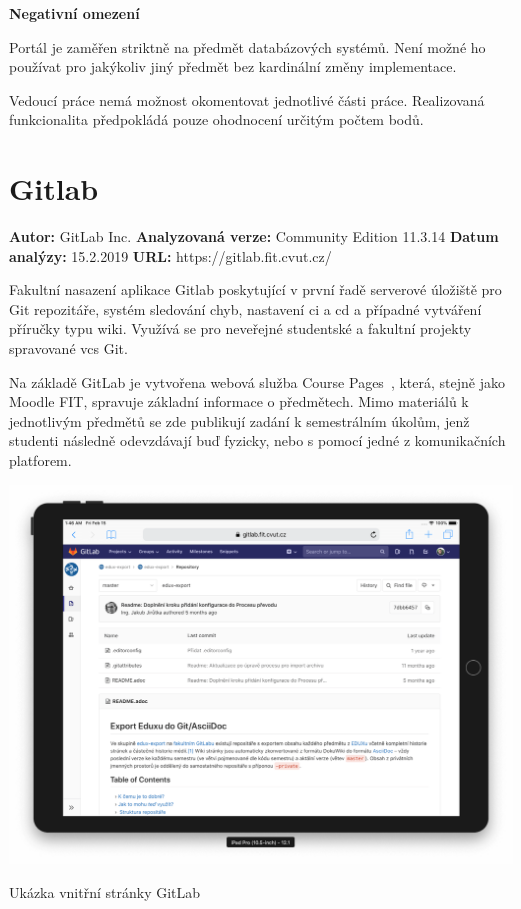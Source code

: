 \textbf{Negativní omezení}

\begin{ul}
   \item
   Portál je zaměřen striktně na předmět databázových systémů. Není možné ho používat pro jakýkoliv jiný předmět bez kardinální změny implementace.
   \item
   Vedoucí práce nemá možnost okomentovat jednotlivé části práce. Realizovaná funkcionalita předpokládá pouze ohodnocení určitým počtem bodů.
\end{ul}




\section{Gitlab}

\textbf{Autor:} GitLab Inc.\newline
\textbf{Analyzovaná verze:} Community Edition 11.3.14\newline
\textbf{Datum analýzy:} 15.2.2019\newline
\textbf{URL:} https://gitlab.fit.cvut.cz/

Fakultní nasazení aplikace Gitlab poskytující v první řadě serverové úložiště pro Git repozitáře, systém sledování chyb, nastavení \gls{ci} a \gls{cd} a případné vytváření příručky typu wiki. Využívá se pro neveřejné studentské a fakultní projekty spravované \gls{vcs} Git.

Na základě GitLab je vytvořena webová služba Course Pages~\cite{courses}, která, stejně jako Moodle FIT, spravuje základní informace o předmětech. Mimo materiálů k jednotlivým předmětů se zde publikují zadání k semestrálním úkolům, jenž studenti následně odevzdávají buď fyzicky, nebo s pomocí jedné z komunikačních platforem.

\begin{fig:illustration}
   \includegraphics[width=1\textwidth]{images/analyza-gitlab.png}
   \caption{Ukázka vnitřní stránky GitLab}\label{pic:analyza-gitlab}
\end{fig:illustration}

